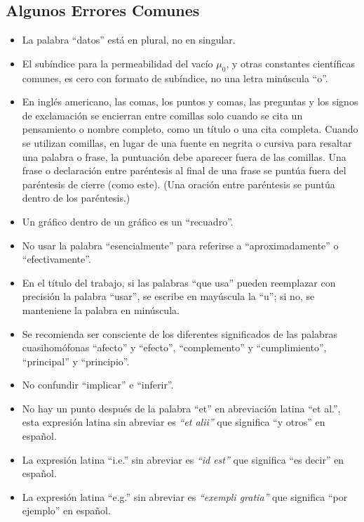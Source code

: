 \documentclass[letterpaper, 10pt, conference]{IEEEtran} %
\begin{document}
	\subsection{Algunos Errores Comunes} \label{subseccionAlgunosErroresComunes}
	\begin{itemize}
		\item La palabra ``datos'' está en plural, no en singular.
		\item El subíndice para la permeabilidad del vacío $\mu_{0}$, y otras constantes científicas comunes, es cero con formato de subíndice, no una letra minúscula ``o''.
		\item En inglés americano, las comas, los puntos y comas, las preguntas y los signos de exclamación se encierran entre comillas solo cuando se cita un pensamiento o nombre completo, como un título o una cita completa. Cuando se utilizan comillas, en lugar de una fuente en negrita o cursiva para resaltar una palabra o frase, la puntuación debe aparecer fuera de las comillas. Una frase o declaración entre paréntesis al final de una frase se puntúa fuera del paréntesis de cierre (como este). (Una oración entre paréntesis se puntúa dentro de los paréntesis.)
		\item Un gráfico dentro de un gráfico es un ``recuadro''.
		\item No usar la palabra ``esencialmente'' para referirse a ``aproximadamente'' o ``efectivamente''.
		\item En el título del trabajo, si las palabras ``que usa'' pueden reemplazar con precisión la palabra ``usar'', se escribe en mayúscula la ``u''; si no, se manteniene la palabra en minúscula.
		\item Se recomienda ser consciente de los diferentes significados de las palabras cuasihomófonas ``afecto'' y ``efecto'', ``complemento'' y ``cumplimiento'', ``principal'' y ``principio''.
		\item No confundir ``implicar'' e ``inferir''.
		\item No hay un punto después de la palabra ``et'' en abreviación latina ``et al.'', esta expresión latina sin abreviar es \emph{``et alii''} que significa ``y otros'' en español.
		\item La expresión latina ``i.e.'' sin abreviar es \emph{``id est''} que significa ``es decir'' en español.
		\item La expresión latina ``e.g.'' sin abreviar es \emph{``exempli gratia''} que significa ``por ejemplo'' en español.
	\end{itemize}
\end{document}
